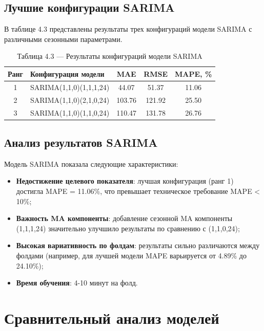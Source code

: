 \subsection{Лучшие конфигурации SARIMA}

\hspace*{1.25cm}В таблице 4.3 представлены результаты трех конфигураций модели SARIMA с различными сезонными параметрами.

\begin{table}[H]
	\centering
	\caption*{Таблица 4.3 --- Результаты конфигураций модели SARIMA}
	\begin{tabular}{|c|p{8cm}|c|c|c|}
		\hline
		\textbf{Ранг} & \textbf{Конфигурация модели} & \textbf{MAE} & \textbf{RMSE} & \textbf{MAPE, \%} \\
		\hline
		1 & SARIMA(1,1,0)(1,1,1,24) & 44.07 & 51.37 & 11.06 \\
		\hline
		2 & SARIMA(1,1,0)(2,1,0,24) & 103.76 & 121.92 & 25.50 \\
		\hline
		3 & SARIMA(1,1,0)(1,1,0,24) & 110.47 & 131.78 & 26.76 \\
		\hline
	\end{tabular}
	\label{tab:sarima_results}
\end{table}

\subsection{Анализ результатов SARIMA}

\hspace*{1.25cm}Модель SARIMA показала следующие характеристики:

\begin{itemize}
	\item \textbf{Недостижение целевого показателя}: лучшая конфигурация (ранг 1) достигла MAPE = 11.06\%, что превышает техническое требование MAPE < 10\%;
	\item \textbf{Важность MA компоненты}: добавление сезонной MA компоненты (1,1,1,24) значительно улучшило результаты по сравнению с (1,1,0,24);
	\item \textbf{Высокая вариативность по фолдам}: результаты сильно различаются между фолдами (например, для лучшей модели MAPE варьируется от 4.89\% до 24.10\%);
	\item \textbf{Время обучения}: 4-10 минут на фолд.
\end{itemize}

\section{Сравнительный анализ моделей}
\label{sec:model_comparison}

